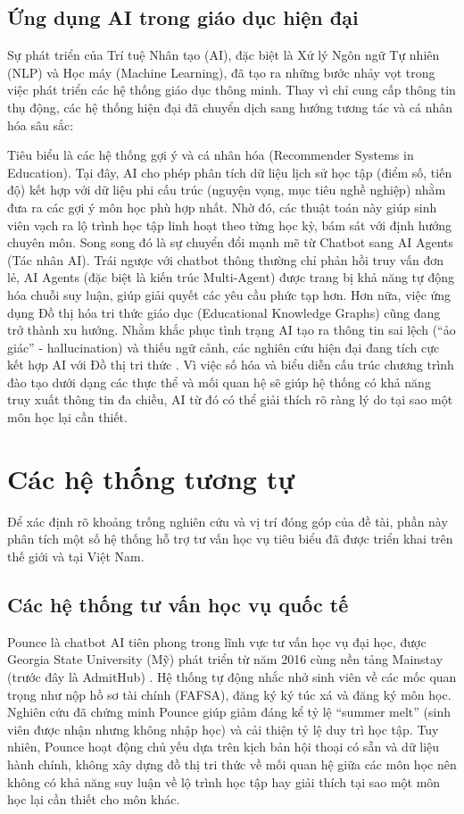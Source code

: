 \subsection{Ứng dụng AI trong giáo dục hiện đại}
Sự phát triển của Trí tuệ Nhân tạo (AI), đặc biệt là Xử lý Ngôn ngữ Tự nhiên (NLP) và Học máy (Machine Learning), đã tạo ra những bước nhảy vọt trong việc phát triển các hệ thống giáo dục thông minh. Thay vì chỉ cung cấp thông tin thụ động, các hệ thống hiện đại đã chuyển dịch sang hướng tương tác và cá nhân hóa sâu sắc:

Tiêu biểu là các hệ thống gợi ý và cá nhân hóa (Recommender Systems in Education). Tại đây, AI cho phép phân tích dữ liệu lịch sử học tập (điểm số, tiến độ) kết hợp với dữ liệu phi cấu trúc (nguyện vọng, mục tiêu nghề nghiệp) nhằm đưa ra các gợi ý môn học phù hợp nhất. Nhờ đó, các thuật toán này giúp sinh viên vạch ra lộ trình học tập linh hoạt theo từng học kỳ, bám sát với định hướng chuyên môn.
Song song đó là sự chuyển đổi mạnh mẽ từ Chatbot sang AI Agents (Tác nhân AI). Trái ngược với chatbot thông thường chỉ phản hồi truy vấn đơn lẻ, AI Agents (đặc biệt là kiến trúc Multi-Agent) được trang bị khả năng tự động hóa chuỗi suy luận, giúp giải quyết các yêu cầu phức tạp hơn.
Hơn nữa, việc ứng dụng Đồ thị hóa tri thức giáo dục (Educational Knowledge Graphs) cũng đang trở thành xu hướng. Nhằm khắc phục tình trạng AI tạo ra thông tin sai lệch (``ảo giác'' - hallucination) và thiếu ngữ cảnh, các nghiên cứu hiện đại đang tích cực kết hợp AI với Đồ thị tri thức \cite{hogan2021knowledge}. Vì việc số hóa và biểu diễn cấu trúc chương trình đào tạo dưới dạng các thực thể và mối quan hệ sẽ giúp hệ thống có khả năng truy xuất thông tin đa chiều, AI từ đó có thể giải thích rõ ràng lý do tại sao một môn học lại cần thiết.

\section{Các hệ thống tương tự}
Để xác định rõ khoảng trống nghiên cứu và vị trí đóng góp của đề tài, phần này phân tích một số hệ thống hỗ trợ tư vấn học vụ tiêu biểu đã được triển khai trên thế giới và tại Việt Nam.

\subsection{Các hệ thống tư vấn học vụ quốc tế}

Pounce là chatbot AI tiên phong trong lĩnh vực tư vấn học vụ đại học, được Georgia State University (Mỹ) phát triển từ năm 2016 cùng nền tảng Mainstay (trước đây là AdmitHub) \cite{page2017pounce}. Hệ thống tự động nhắc nhở sinh viên về các mốc quan trọng như nộp hồ sơ tài chính (FAFSA), đăng ký ký túc xá và đăng ký môn học. Nghiên cứu đã chứng minh Pounce giúp giảm đáng kể tỷ lệ ``summer melt'' (sinh viên được nhận nhưng không nhập học) và cải thiện tỷ lệ duy trì học tập. Tuy nhiên, Pounce hoạt động chủ yếu dựa trên kịch bản hội thoại có sẵn và dữ liệu hành chính, không xây dựng đồ thị tri thức về mối quan hệ giữa các môn học nên không có khả năng suy luận về lộ trình học tập hay giải thích tại sao một môn học lại cần thiết cho môn khác.

